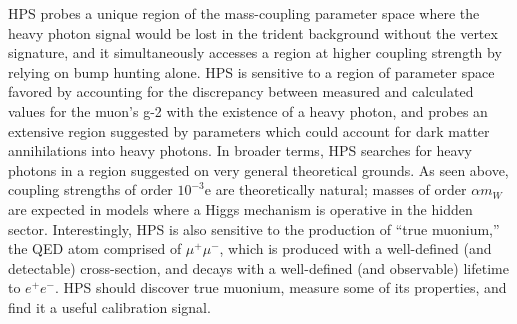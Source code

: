 HPS  probes a unique region of the mass-coupling parameter space where the heavy photon signal would be lost in the trident background without the vertex signature, and it simultaneously accesses a region at higher coupling strength by relying on bump hunting alone. HPS is sensitive to a region of parameter space favored by accounting for the discrepancy between  measured and calculated  values for the muon's g-2 with the existence of  a heavy photon, and probes an extensive region suggested by parameters which could account for dark matter annihilations into heavy photons.  In broader  terms, HPS searches for heavy photons in a region suggested on very general theoretical grounds. As seen above, coupling strengths of order $10^{-3}$e are theoretically natural; masses of order  $\alpha m_W$ are  expected in models where a Higgs mechanism is operative in the hidden sector.  Interestingly, HPS is also sensitive to the production of ``true muonium,'' the QED atom comprised of $\mu^+ \mu^-$, which is produced with a well-defined (and detectable) cross-section, and decays with a well-defined  (and observable) lifetime to $e^+e^-$. HPS should discover true muonium, measure some of its properties, and find it a useful calibration signal.

